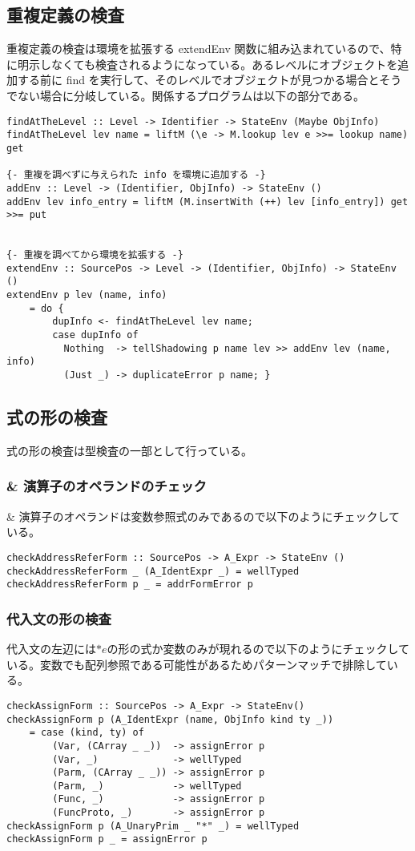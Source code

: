 \documentclass{jsarticle}
\begin{document}
\subsection{重複定義の検査}
重複定義の検査は環境を拡張する extendEnv 関数に組み込まれているので、特に明示しなくても検査されるようになっている。あるレベルにオブジェクトを追加する前に find を実行して、そのレベルでオブジェクトが見つかる場合とそうでない場合に分岐している。関係するプログラムは以下の部分である。
\begin{verbatim}
findAtTheLevel :: Level -> Identifier -> StateEnv (Maybe ObjInfo)
findAtTheLevel lev name = liftM (\e -> M.lookup lev e >>= lookup name) get

{- 重複を調べずに与えられた info を環境に追加する -}
addEnv :: Level -> (Identifier, ObjInfo) -> StateEnv ()
addEnv lev info_entry = liftM (M.insertWith (++) lev [info_entry]) get >>= put


{- 重複を調べてから環境を拡張する -}
extendEnv :: SourcePos -> Level -> (Identifier, ObjInfo) -> StateEnv ()
extendEnv p lev (name, info)
    = do {
        dupInfo <- findAtTheLevel lev name;
        case dupInfo of
          Nothing  -> tellShadowing p name lev >> addEnv lev (name, info)
          (Just _) -> duplicateError p name; }
\end{verbatim}

\subsection{式の形の検査}
式の形の検査は型検査の一部として行っている。
\subsubsection{\& 演算子のオペランドのチェック}
\& 演算子のオペランドは変数参照式のみであるので以下のようにチェックしている。
\begin{verbatim}
checkAddressReferForm :: SourcePos -> A_Expr -> StateEnv ()
checkAddressReferForm _ (A_IdentExpr _) = wellTyped
checkAddressReferForm p _ = addrFormError p
\end{verbatim}

\subsubsection{代入文の形の検査}
代入文の左辺には$*e$の形の式か変数のみが現れるので以下のようにチェックしている。変数でも配列参照である可能性があるためパターンマッチで排除している。
\begin{verbatim}
checkAssignForm :: SourcePos -> A_Expr -> StateEnv()
checkAssignForm p (A_IdentExpr (name, ObjInfo kind ty _))
    = case (kind, ty) of
        (Var, (CArray _ _))  -> assignError p
        (Var, _)             -> wellTyped
        (Parm, (CArray _ _)) -> assignError p
        (Parm, _)            -> wellTyped
        (Func, _)            -> assignError p
        (FuncProto, _)       -> assignError p
checkAssignForm p (A_UnaryPrim _ "*" _) = wellTyped
checkAssignForm p _ = assignError p
\end{verbatim}
\end{document}

